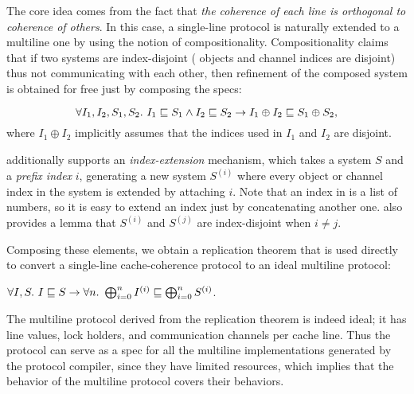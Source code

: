 \documentclass[sigplan,10pt,review,anonymous,screen]{acmart}\settopmatter{printfolios=true,printccs=false,printacmref=false}
\begin{document}
The core idea comes from the fact that \emph{the coherence of each line is orthogonal to coherence of others}.
In this case, a single-line \hemiola{} protocol is naturally extended to a multiline one by using the notion of compositionality.
Compositionality claims that if two systems are index-disjoint (\ie{} objects and channel indices are disjoint) thus not communicating with each other, then refinement of the composed system is obtained for free just by composing the specs:
\begin{theorem}[Compositionality]
  \begin{displaymath}
    \forall I_1, I_2, S_1, S_2.\ \refines{I_1}{S_1} \land \refines{I_2}{S_2} \to
    \refines{I_1 \oplus I_2}{S_1 \oplus S_2},
  \end{displaymath}
  where $I_1 \oplus I_2$ implicitly assumes that the indices used in $I_1$ and $I_2$ are disjoint.
\end{theorem}

\hemiola{} additionally supports an \emph{index-extension} mechanism, which takes a system $S$ and a \emph{prefix index} $i$, generating a new system $S^{(i)}$ where every object or channel index in the system is extended by attaching $i$.
Note that an index in \hemiola{} is a list of numbers, so it is easy to extend an index just by concatenating another one.
\hemiola{} also provides a lemma that $S^{(i)}$ and $S^{(j)}$ are index-disjoint when $i \neq j$.

Composing these elements, we obtain a replication theorem that is used directly to convert a single-line cache-coherence protocol to an ideal multiline protocol:
\begin{theorem}[Replication]
  $\forall I, S.\ I \sqsubseteq S \to \forall n.\ \bigoplus^{n}_{i=0} I^{(i)} \sqsubseteq \bigoplus^{n}_{i=0} S^{(i)}$.
  \label{thm-replication}
\end{theorem}

The multiline protocol derived from the replication theorem is indeed ideal; it has line values, lock holders, and communication channels per cache line.
Thus the protocol can serve as a spec for all the multiline implementations generated by the protocol compiler, since they have limited resources, which implies that the behavior of the multiline protocol covers their behaviors.
\end{document}
